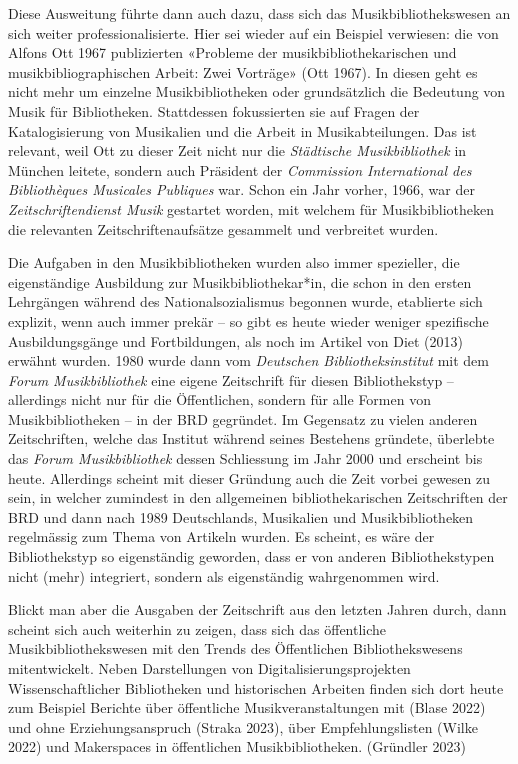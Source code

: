 \documentclass[a4paper,
fontsize=11pt,
oneside,
numbers=noperiodatend,
parskip=half-,
bibliography=totoc,
final
]{scrartcl}
\begin{document}
Diese Ausweitung führte dann auch dazu, dass sich das
Musikbibliothekswesen an sich weiter professionalisierte. Hier sei
wieder auf ein Beispiel verwiesen: die von Alfons Ott 1967 publizierten
«Probleme der musikbibliothekarischen und musikbibliographischen Arbeit:
Zwei Vorträge» (Ott 1967). In diesen geht es nicht mehr um einzelne
Musikbibliotheken oder grundsätzlich die Bedeutung von Musik für
Bibliotheken. Stattdessen fokussierten sie auf Fragen der
Katalogisierung von Musikalien und die Arbeit in Musikabteilungen. Das
ist relevant, weil Ott zu dieser Zeit nicht nur die \emph{Städtische
Musikbibliothek} in München leitete, sondern auch Präsident der
\emph{Commission International des Bibliothèques Musicales Publiques}
war. Schon ein Jahr vorher, 1966, war der \emph{Zeitschriftendienst
Musik} gestartet worden, mit welchem für Musikbibliotheken die
relevanten Zeitschriftenaufsätze gesammelt und verbreitet wurden.

Die Aufgaben in den Musikbibliotheken wurden also immer spezieller, die
eigenständige Ausbildung zur Musikbibliothekar*in, die schon in den
ersten Lehrgängen während des Nationalsozialismus begonnen wurde,
etablierte sich explizit, wenn auch immer prekär -- so gibt es heute
wieder weniger spezifische Ausbildungsgänge und Fortbildungen, als noch
im Artikel von Diet (2013) erwähnt wurden. 1980 wurde dann vom
\emph{Deutschen Bibliotheksinstitut} mit dem \emph{Forum
Musikbibliothek} eine eigene Zeitschrift für diesen Bibliothekstyp --
allerdings nicht nur für die Öffentlichen, sondern für alle Formen von
Musikbibliotheken -- in der BRD gegründet. Im Gegensatz zu vielen
anderen Zeitschriften, welche das Institut während seines Bestehens
gründete, überlebte das \emph{Forum Musikbibliothek} dessen Schliessung
im Jahr 2000 und erscheint bis heute. Allerdings scheint mit dieser
Gründung auch die Zeit vorbei gewesen zu sein, in welcher zumindest in
den allgemeinen bibliothekarischen Zeitschriften der BRD und dann nach
1989 Deutschlands, Musikalien und Musikbibliotheken regelmässig zum
Thema von Artikeln wurden. Es scheint, es wäre der Bibliothekstyp so
eigenständig geworden, dass er von anderen Bibliothekstypen nicht (mehr)
integriert, sondern als eigenständig wahrgenommen wird.

Blickt man aber die Ausgaben der Zeitschrift aus den letzten Jahren
durch, dann scheint sich auch weiterhin zu zeigen, dass sich das
öffentliche Musikbibliothekswesen mit den Trends des Öffentlichen
Bibliothekswesens mitentwickelt. Neben Darstellungen von
Digitalisierungsprojekten Wissenschaftlicher Bibliotheken und
historischen Arbeiten finden sich dort heute zum Beispiel Berichte über
öffentliche Musikveranstaltungen mit (Blase 2022) und ohne
Erziehungsanspruch (Straka 2023), über Empfehlungslisten (Wilke 2022)
und Makerspaces in öffentlichen Musikbibliotheken. (Gründler 2023)
\end{document}
